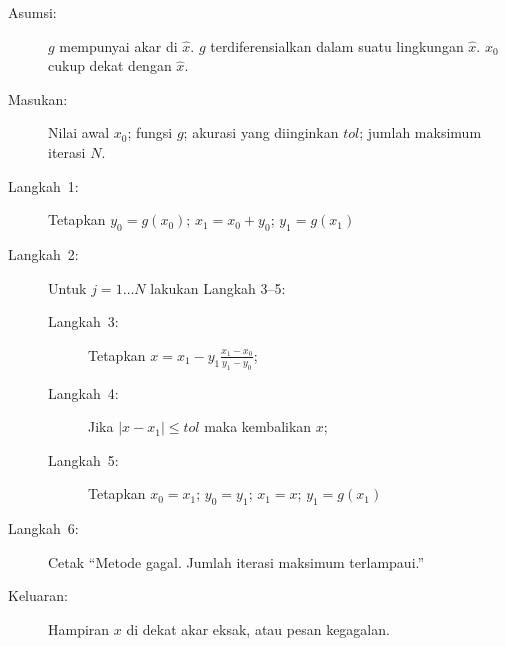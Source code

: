 \begin{pseudocode} 
\begin{description}
\item [{Asumsi:}] $g$ mempunyai akar di $\hat{x}$. $g$ terdiferensialkan
dalam suatu lingkungan $\hat{x}$. $x_{0}$ cukup dekat dengan $\hat{x}$.
\item [{Masukan:}] Nilai awal $x_{0}$; fungsi $g$; akurasi yang diinginkan
$tol$; jumlah maksimum iterasi $N$.
\item [{Langkah~1:}] Tetapkan $y_{0}=g(x_{0})$; $x_{1}=x_{0}+y_{0}$;
$y_{1}=g(x_{1})$
\item [{Langkah~2:}] Untuk $j=1\ldots N$ lakukan Langkah 3--5:

\begin{description}
\item [{Langkah~3:}] Tetapkan $x=x_{1}-y_{1}\frac{x_{1}-x_{0}}{y_{1}-y_{0}}$;
\item [{Langkah~4:}] Jika $|x-x_{1}|\leq tol$ maka kembalikan $x$;
\item [{Langkah~5:}] Tetapkan $x_{0}=x_{1}$; $y_{0}=y_{1}$; $x_{1}=x$;
$y_{1}=g(x_{1})$
\end{description}
\item [{Langkah~6:}] Cetak ``Metode gagal. Jumlah iterasi maksimum terlampaui.''
\item [{Keluaran:}] Hampiran $x$ di dekat akar eksak, atau pesan kegagalan.
\end{description}
\end{pseudocode}  


